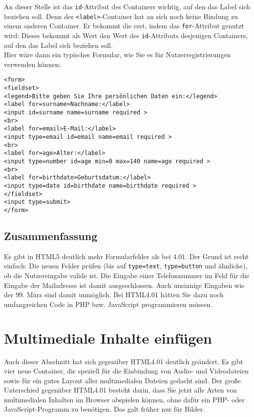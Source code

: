 An dieser Stelle ist das \verb|id|-Attribut des Containers wichtig, auf den das Label sich beziehen soll. Denn der \verb|<label>|-Container hat an sich noch keine Bindung zu einem anderen Container. Er bekommt die erst, indem das \verb|for|-Attribut genutzt wird: Dieses bekommt als Wert den Wert des \verb|id|-Attributs desjenigen Containers, auf den das Label sich beziehen soll.\\

Hier wäre dann ein typisches Formular, wie Sie es für Nutzerregistrierungen verwenden können:\\

\begin{verbatim}
<form>
<fieldset>
<legend>Bitte geben Sie Ihre persönlichen Daten ein:</legend>
<label for=surname>Nachname:</label>
<input id=surname name=surname required >
<br>
<label for=email>E-Mail:</label>
<input type=email id=email name=email required >
<br>
<label for=age>Alter:</label>
<input type=number id=age min=0 max=140 name=age required >
<br>
<label for=birthdate>Geburtsdatum:</label>
<input type=date id=birthdate name=birthdate required >
</fieldset>
<input type=submit>
</form>          
\end{verbatim}

\subsection{Zusammenfassung}

Es gibt in HTML5 deutlich mehr Formularfelder als bei 4.01. Der Grund ist recht einfach: Die neuen Felder prüfen (bis auf \verb|type=text|, \verb|type=button| und ähnliche), ob die Nutzereingabe valide ist. Die Eingabe einer Telefonnummer im Feld für die Eingabe der Mailadresse ist damit ausgeschlossen. Auch unsinnige Eingaben wie der 99. März sind damit unmöglich. Bei HTML4.01 hätten Sie dazu noch umfangreichen Code in PHP bzw. JavaScript programmieren müssen.

\section{Multimediale Inhalte einfügen}

Auch dieser Abschnitt hat sich gegenüber HTML4.01 deutlich geändert. Es gibt vier neue Container, die speziell für die Einbindung von Audio- und Videodateien sowie für ein gutes Layout aller multimedialen Dateien gedacht sind. Der große Unterschied gegenüber HTML4.01 besteht darin, dass Sie jetzt alle Arten von multimedialen Inhalten im Browser abspielen können, ohne dafür ein PHP- oder JavaScript-Programm zu benötigen. Das galt früher nur für Bilder.\\

